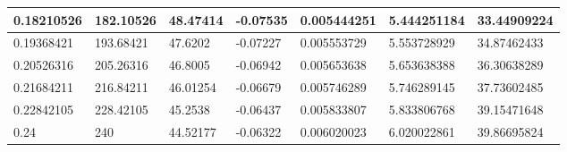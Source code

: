 \documentclass[hyperref,a4paper,UTF8]{ctexart}
\begin{document}
\begin{table}[!ht]
\begin{tabular}{|l|l|l|l|l|l|l|}
        0.18210526 & 182.10526 & 48.47414 & -0.07535 & 0.005444251 & 5.444251184 & 33.44909224 \\ \hline
        0.19368421 & 193.68421 & 47.6202 & -0.07227 & 0.005553729 & 5.553728929 & 34.87462433 \\ \hline
        0.20526316 & 205.26316 & 46.8005 & -0.06942 & 0.005653638 & 5.653638388 & 36.30638289 \\ \hline
        0.21684211 & 216.84211 & 46.01254 & -0.06679 & 0.005746289 & 5.746289145 & 37.73602485 \\ \hline
        0.22842105 & 228.42105 & 45.2538 & -0.06437 & 0.005833807 & 5.833806768 & 39.15471648 \\ \hline
        0.24 & 240 & 44.52177 & -0.06322 & 0.006020023 & 6.020022861 & 39.86695824 \\ \hline
    \end{tabular}
\end{table}
\end{document}
